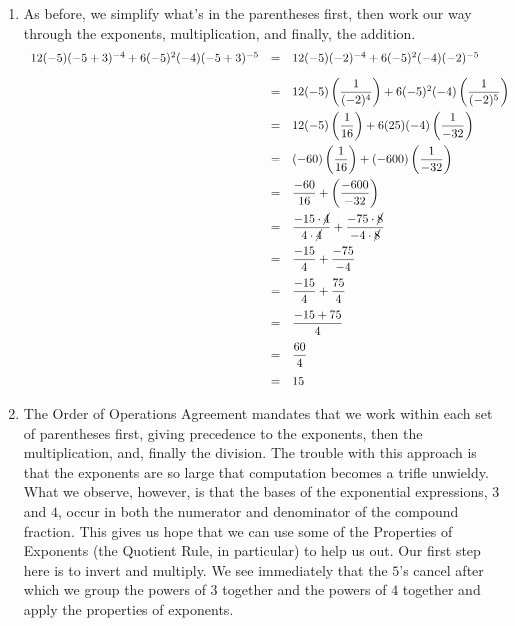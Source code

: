 \documentclass{ximera}
\begin{document}
\begin{example}
\begin{enumerate}
\item  As before, we simplify what's in the parentheses first, then work our way through the exponents, multiplication, and finally, the addition.\[ \begin{array}{rclr}

12(-5)(-5+3)^{-4}+6(-5)^2(-4)(-5+3)^{-5} & = & 12(-5)(-2)^{-4} + 6(-5)^{2}(-4)(-2)^{-5} \\ [10pt]
                                         & = & 12(-5)\left(\dfrac{1}{(-2)^4}\right) + 6(-5)^{2}(-4)\left(\dfrac{1}{(-2)^5}\right)& \\ [10pt]
                                        
                                         & = & 12(-5)\left(\dfrac{1}{16}\right) + 6(25)(-4)\left(\dfrac{1}{-32}\right)& \\ [10pt]
																				
																				& = & (-60)\left(\dfrac{1}{16}\right) + (-600)\left(\dfrac{1}{-32}\right)& \\ [10pt]

	& = & \dfrac{-60}{16} + \left(\dfrac{-600}{-32}\right)&  \\ [10pt]
		& = & \dfrac{-15\cdot \cancel{4}}{4 \cdot \cancel{4}} + \dfrac{-75 \cdot \cancel{8}}{-4 \cdot \cancel{8}} & \\ [10pt]
		& = & \dfrac{-15}{4} + \dfrac{-75}{-4} & \\ [10pt]
			& = & \dfrac{-15}{4} + \dfrac{75}{4} & \\ [10pt]
				& = & \dfrac{-15 + 75}{4} & \\ [10pt]
				& = & \dfrac{60}{4} & \\ [10pt]
	       & = & 15 & \\  \end{array}\]
				
\item  The Order of Operations Agreement mandates that we work within each set of parentheses first, giving precedence to the exponents, then the multiplication, and, finally the division.  The trouble with this approach is that the exponents are so large that computation becomes a trifle unwieldy.   What we observe, however, is that the bases of the exponential expressions, $3$ and $4$, occur in both the numerator and denominator of the compound fraction.  This gives us hope that we can use some of the Properties of Exponents (the Quotient Rule, in particular) to help us out. Our first step here is to invert and multiply.  We see immediately that the $5$'s cancel after which we group the powers of $3$ together and the powers of $4$ together and apply the properties of exponents.\[ \begin{array}{rclclcl}


\end{array}\]
\end{enumerate}
\end{example}
\end{document}
